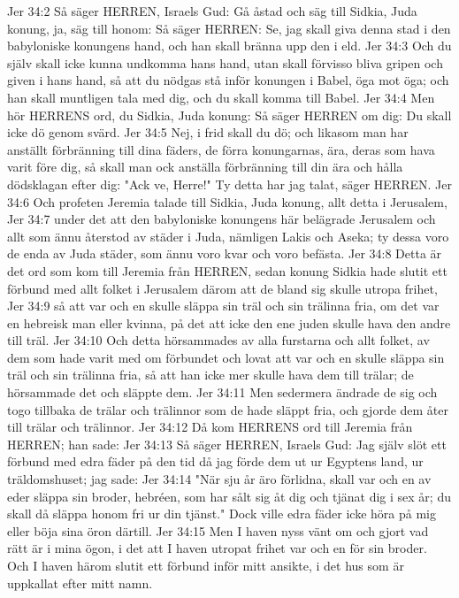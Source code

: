 Jer 34:2  Så säger HERREN, Israels Gud: Gå åstad och säg till Sidkia, Juda konung, ja, säg till honom: Så säger HERREN: Se, jag skall giva denna stad i den babyloniske konungens hand, och han skall bränna upp den i eld.
Jer 34:3  Och du själv skall icke kunna undkomma hans hand, utan skall förvisso bliva gripen och given i hans hand, så att du nödgas stå inför konungen i Babel, öga mot öga; och han skall muntligen tala med dig, och du skall komma till Babel.
Jer 34:4  Men hör HERRENS ord, du Sidkia, Juda konung: Så säger HERREN om dig: Du skall icke dö genom svärd.
Jer 34:5  Nej, i frid skall du dö; och likasom man har anställt förbränning till dina fäders, de förra konungarnas, ära, deras som hava varit före dig, så skall man ock anställa förbränning till din ära och hålla dödsklagan efter dig: "Ack ve, Herre!" Ty detta har jag talat, säger HERREN.
Jer 34:6  Och profeten Jeremia talade till Sidkia, Juda konung, allt detta i Jerusalem,
Jer 34:7  under det att den babyloniske konungens här belägrade Jerusalem och allt som ännu återstod av städer i Juda, nämligen Lakis och Aseka; ty dessa voro de enda av Juda städer, som ännu voro kvar och voro befästa.
Jer 34:8  Detta är det ord som kom till Jeremia från HERREN, sedan konung Sidkia hade slutit ett förbund med allt folket i Jerusalem därom att de bland sig skulle utropa frihet,
Jer 34:9  så att var och en skulle släppa sin träl och sin trälinna fria, om det var en hebreisk man eller kvinna, på det att icke den ene juden skulle hava den andre till träl.
Jer 34:10  Och detta hörsammades av alla furstarna och allt folket, av dem som hade varit med om förbundet och lovat att var och en skulle släppa sin träl och sin trälinna fria, så att han icke mer skulle hava dem till trälar; de hörsammade det och släppte dem.
Jer 34:11  Men sedermera ändrade de sig och togo tillbaka de trälar och trälinnor som de hade släppt fria, och gjorde dem åter till trälar och trälinnor.
Jer 34:12  Då kom HERRENS ord till Jeremia från HERREN; han sade:
Jer 34:13  Så säger HERREN, Israels Gud: Jag själv slöt ett förbund med edra fäder på den tid då jag förde dem ut ur Egyptens land, ur träldomshuset; jag sade:
Jer 34:14  "När sju år äro förlidna, skall var och en av eder släppa sin broder, hebréen, som har sålt sig åt dig och tjänat dig i sex år; du skall då släppa honom fri ur din tjänst." Dock ville edra fäder icke höra på mig eller böja sina öron därtill.
Jer 34:15  Men I haven nyss vänt om och gjort vad rätt är i mina ögon, i det att I haven utropat frihet var och en för sin broder. Och I haven härom slutit ett förbund inför mitt ansikte, i det hus som är uppkallat efter mitt namn.
